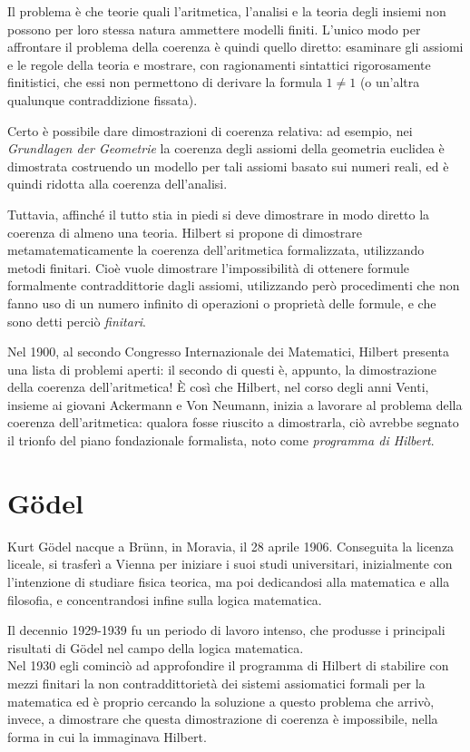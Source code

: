 Il problema è che teorie quali l'aritmetica, l'analisi e la teoria degli insiemi non possono per loro stessa natura ammettere modelli finiti. L'unico modo per affrontare il problema della coerenza è quindi quello diretto: esaminare gli assiomi e le regole della teoria e mostrare, con ragionamenti sintattici rigorosamente finitistici, che essi non permettono di derivare la formula $1\neq 1$ (o un'altra qualunque contraddizione fissata).

Certo è possibile dare dimostrazioni di coerenza relativa: ad esempio, nei \emph{Grundlagen der Geometrie} la coerenza degli assiomi della geometria euclidea è dimostrata costruendo un modello per tali assiomi basato sui numeri reali, ed è quindi ridotta alla coerenza dell'analisi.

Tuttavia, affinché il tutto stia in piedi si deve dimostrare in modo diretto la coerenza di almeno una teoria.
Hilbert si propone di dimostrare me\-ta\-ma\-te\-ma\-ti\-ca\-men\-te la coerenza dell'a\-ritme\-ti\-ca formalizzata, utilizzando metodi finitari. Cioè vuole dimostrare l'impossibilità di ottenere formule formalmente contraddittorie dagli assiomi, utilizzando però procedimenti che non fanno uso di un numero infinito di operazioni o proprietà delle formule, e che sono detti perciò \emph{finitari}.

Nel 1900, al secondo Congresso Internazionale dei Matematici, Hilbert presenta una lista di problemi aperti: il secondo di questi è, appunto, la dimostrazione della coerenza dell'aritmetica!
\`{E} così che Hilbert, nel corso degli anni Venti, insieme ai giovani Ackermann e Von Neumann, inizia a lavorare al problema della coerenza dell'aritmetica: qualora fosse riuscito a dimostrarla, ciò avrebbe segnato il trionfo del piano fondazionale formalista, noto come \emph{programma di Hilbert}.
\bigskip

\section{G\"odel}

Kurt G\"{o}del nacque a Br\"unn, in Moravia, il 28 aprile 1906. Conseguita la licenza liceale, si trasferì a Vienna per iniziare i suoi studi universitari, inizialmente con l'intenzione di studiare fisica teorica, ma poi dedicandosi alla matematica e alla filosofia, e concentrandosi infine sulla logica matematica.

Il decennio 1929-1939 fu un periodo di lavoro intenso, che produsse i principali risultati di G\"odel nel campo della logica matematica.\\
Nel 1930 egli cominciò ad approfondire il programma di Hilbert di stabilire con mezzi finitari la non contraddittorietà dei sistemi assiomatici formali per la ma\-te\-ma\-ti\-ca ed  è proprio cercando la soluzione a questo problema che arrivò, invece, a dimostrare che questa dimostrazione di coerenza è impossibile, nella forma in cui la immaginava Hilbert. 

